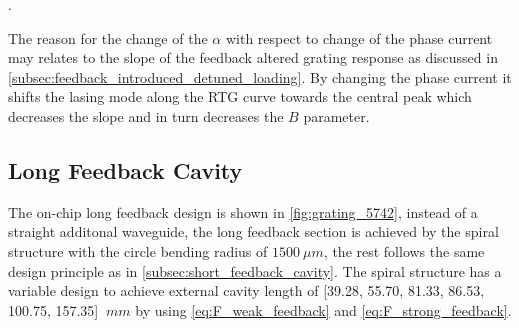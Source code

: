 \begin{table}[ht]
    \centering
    \caption{Measured chirp parameter $\alpha$ by fixing the gain current at $75 \ mA$ and scan the phase section in the external feedback section from $10 \ mA$ to $14 \ mA$. Increasement of the chirp parameter $\alpha$ is observed from $1.793$ to $3.245$}.
    \label{tab:chirp_6559}
\end{table}

The reason for the change of the $\alpha$ with respect to change of the phase current may relates to the slope of the feedback altered grating response as discussed in \autoref{subsec:feedback_introduced_detuned_loading}. By changing the phase current it shifts the lasing mode along the RTG curve towards the central peak which decreases the slope and in turn decreases the $B$ parameter.

\subsection{Long Feedback Cavity} \label{subsec:long_feedback_cavity}
The on-chip long feedback design is shown in \autoref{fig:grating_5742}, instead of a straight additonal waveguide, the long feedback section is achieved by the spiral structure with the circle bending radius of $1500 \ \mu m$, the rest follows the same design principle as in \autoref{subsec:short_feedback_cavity}. The spiral structure has a variable design to achieve external cavity length of [39.28, 55.70, 81.33, 86.53, 100.75, 157.35] $\ mm$ by using \autoref{eq:F_weak_feedback} and \autoref{eq:F_strong_feedback}.

